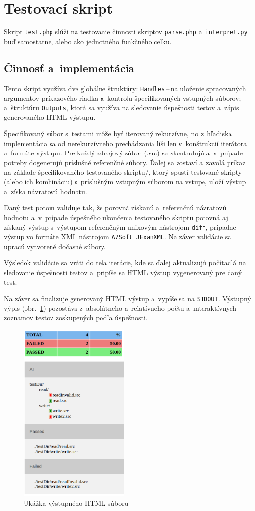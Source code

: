 \documentclass[a4paper, 10pt, twocolumn]{article}
\begin{document}
\section{Testovací skript}
    Skript \texttt{test.php} slúži na testovanie činnosti skriptov \texttt{parse.php} a~\texttt{interpret.py} buď samostatne, alebo ako jednotného funkčného celku.
    
    \subsection{Činnosť a~implementácia}
        Tento skript využíva dve globálne štruktúry: \mbox{\texttt{Handles}\,--\,na} uloženie spracovaných argumentov príkazového riadka a~kontrolu špecifikovaných vstupných súborov; a~štruktúru \texttt{Outputs}, ktorá sa využíva na sledovanie úspešnosti testov a~zápis generovaného HTML výstupu.
        
        Špecifikovaný súbor s~testami môže byť iterovaný rekurzívne, no z~hľadiska implementácia sa od nerekurzívneho prechádzania líši len v~konštrukcií iterátora a~formáte výstupu. Pre každý zdrojový súbor (.src) sa skontrolujú a~v~prípade potreby dogenerujú príslušné referenčné súbory. Ďalej sa zostaví a~zavolá príkaz na základe špecifikovaného testovaného skriptu/, ktorý spustí testované skripty (alebo ich kombináciu) s~príslušným vstupným súborom na vstupe, uloží výstup a~získa návratovú hodnotu.
        
        Daný test potom validuje tak, že porovná získanú a~referenčnú návratovú hodnotu a~v~prípade úspešného ukončenia testovaného skriptu porovná aj získaný výstup s~výstupom referenčným unixovým nástrojom \texttt{diff}, prípadne výstup vo formáte XML nástrojom \texttt{A7Soft JExamXML}. Na záver validácie sa upracú vytvorené dočasné súbory.
    
        Výsledok validácie sa vráti do tela iterácie, kde sa ďalej aktualizujú počítadlá na sledovanie úspešnosti testov a~pripíše sa HTML výstup vygenerovaný pre daný test.
        
        Na záver sa finalizuje generovaný HTML výstup a~vypíše sa na \texttt{STDOUT}. Výstupný výpis (obr.~\ref{fig:output}) pozostáva z~absolútneho a~relatívneho počtu a~interaktívnych zoznamov testov zoskupených podľa úspešnosti.
        
    \begin{figure}
        \centering
        \includegraphics[width=0.48\textwidth]{testExample.png}
        \caption{Ukážka výstupného HTML súboru}
        \label{fig:output}
    \end{figure}
\end{document}
